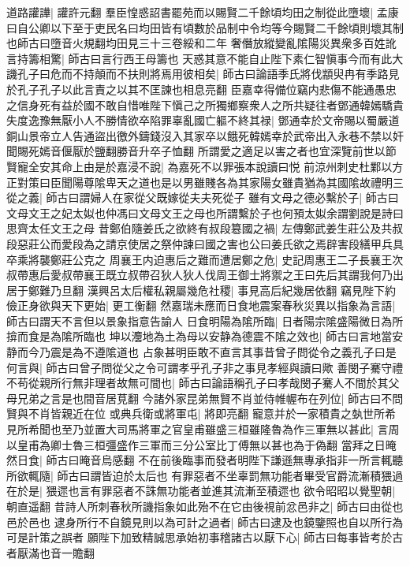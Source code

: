 道路讙譁|{
	讙許元翻}
羣臣惶惑詔書罷苑而以賜賢二千餘頃均田之制從此墮壞|{
	孟康曰自公卿以下至于吏民名曰均田皆有頃數於品制中令均等今賜賢二千餘頃則壞其制也師古曰墮音火規翻均田見三十三卷綏和二年}
奢僭放縱變亂隂陽災異衆多百姓訛言持籌相驚|{
	師古曰言行西王母籌也}
天惑其意不能自止陛下素仁智愼事今而有此大譏孔子曰危而不持顛而不扶則將焉用彼相矣|{
	師古曰論語季氏將伐顓臾冉有季路見於孔子孔子以此言責之以其不匡諫也相息亮翻}
臣嘉幸得備位竊内悲傷不能通愚忠之信身死有益於國不敢自惜唯陛下愼己之所獨鄉察衆人之所共疑往者鄧通韓嫣驕貴失度逸豫無厭小人不勝情欲卒陷罪辜亂國亡軀不終其禄|{
	鄧通幸於文帝賜以蜀嚴道銅山景帝立人告通盜出徼外鑄錢沒入其家卒以餓死韓嫣幸於武帝出入永巷不禁以奸聞賜死嫣音偃厭於鹽翻勝音升卒子恤翻}
所謂愛之適足以害之者也宜深覽前世以節賢寵全安其命上由是於嘉浸不說|{
	為嘉死不以罪張本說讀曰悦}
前涼州刺史杜鄴以方正對策曰臣聞陽尊隂卑天之道也是以男雖賤各為其家陽女雖貴猶為其國隂故禮明三從之義|{
	師古曰謂婦人在家從父既嫁從夫夫死從子}
雖有文母之德必繫於子|{
	師古曰文母文王之妃太姒也仲馮曰文母文王之母也所謂繫於子也何預太姒余謂劉說是詩曰思齊太任文王之母}
昔鄭伯隨姜氏之欲終有叔段簒國之禍|{
	左傳鄭武姜生莊公及共叔段惡莊公而愛段為之請京使居之祭仲諫曰國之害也公曰姜氏欲之焉辟害段繕甲兵具卒乘將襲鄭莊公克之}
周襄王内迫惠后之難而遭居鄭之危|{
	史記周惠王二子長襄王次叔帶惠后愛叔帶襄王既立叔帶召狄人狄人伐周王御士將禦之王曰先后其謂我何乃出居于鄭難乃旦翻}
漢興呂太后權私親屬幾危社稷|{
	事見高后紀幾居依翻}
竊見陛下約儉正身欲與天下更始|{
	更工衡翻}
然嘉瑞未應而日食地震案春秋災異以指象為言語|{
	師古曰謂天不言但以景象指意告諭人}
日食明陽為隂所臨|{
	日者陽宗隂盛陽微日為所揜而食是為隂所臨也}
坤以灋地為土為母以安静為德震不隂之效也|{
	師古曰言地當安静而今乃震是為不遵隂道也}
占象甚明臣敢不直言其事昔曾子問從令之義孔子曰是何言與|{
	師古曰曾子問從父之令可謂孝乎孔子非之事見孝經與讀曰歟}
善閔子騫守禮不苟從親所行無非理者故無可間也|{
	師古曰論語稱孔子曰孝哉閔子騫人不間於其父母兄弟之言是也間音居莧翻}
今諸外家昆弟無賢不肖並侍帷幄布在列位|{
	師古曰不問賢與不肖皆親近在位}
或典兵衛或將軍屯|{
	將即亮翻}
寵意并於一家積貴之埶世所希見所希聞也至乃並置大司馬將軍之官皇甫雖盛三桓雖隆魯為作三軍無以甚此|{
	言周以皇甫為卿士魯三桓彊盛作三軍而三分公室比丁傅無以甚也為于偽翻}
當拜之日晻然日食|{
	師古曰晻音烏感翻}
不在前後臨事而發者明陛下謙遜無專承指非一所言輒聽所欲輒隨|{
	師古曰謂皆迫於太后也}
有罪惡者不坐辜罰無功能者畢受官爵流漸積猥過在於是|{
	猥遝也言有罪惡者不誅無功能者並進其流漸至積遝也}
欲令昭昭以覺聖朝|{
	朝直遥翻}
昔詩人所刺春秋所譏指象如此殆不在它由後視前忿邑非之|{
	師古曰由從也邑於邑也}
逮身所行不自鏡見則以為可計之過者|{
	師古曰逮及也鏡鑒照也自以所行為可是計策之誤者}
願陛下加致精誠思承始初事稽諸古以厭下心|{
	師古曰每事皆考於古者厭滿也音一贍翻}
